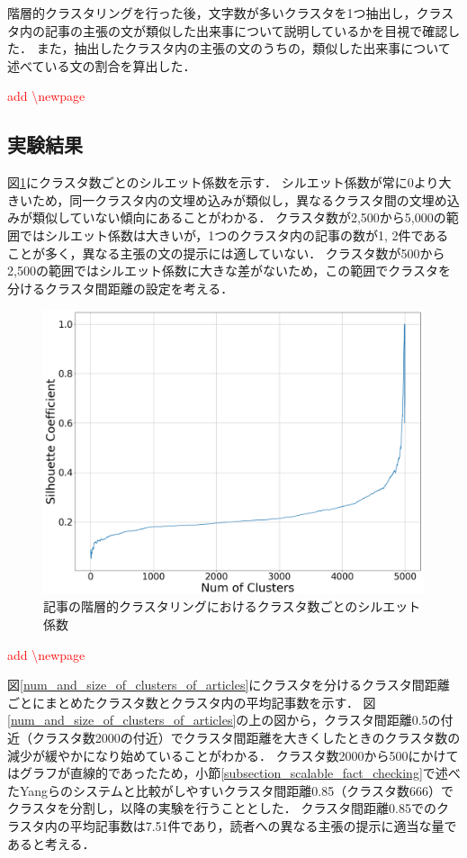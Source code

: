 \documentclass[12pt,a4j]{jreport}
\begin{document}
階層的クラスタリングを行った後，文字数が多いクラスタを1つ抽出し，クラスタ内の記事の主張の文が類似した出来事について説明しているかを目視で確認した．
また，抽出したクラスタ内の主張の文のうちの，類似した出来事について述べている文の割合を算出した．

\textcolor{red}{add \textbackslash newpage}
\newpage

\subsection{実験結果}
図\ref{articles_silhouette}にクラスタ数ごとのシルエット係数を示す．
シルエット係数が常に0より大きいため，同一クラスタ内の文埋め込みが類似し，異なるクラスタ間の文埋め込みが類似していない傾向にあることがわかる．
クラスタ数が2,500から5,000の範囲ではシルエット係数は大きいが，1つのクラスタ内の記事の数が1, 2件であることが多く，異なる主張の文の提示には適していない．
クラスタ数が500から2,500の範囲ではシルエット係数に大きな差がないため，この範囲でクラスタを分けるクラスタ間距離の設定を考える．

\begin{figure}[H]
	\centering
	\includegraphics[keepaspectratio, width=120mm]{img/process-06_articles-cluster_num-of-clusters-dependency-on-silhouette-coefficient_with-maximal-silhoette_reduced-data-to-5000_Trim.png}
	\caption{記事の階層的クラスタリングにおけるクラスタ数ごとのシルエット係数}
	\label{articles_silhouette}
\end{figure}

\textcolor{red}{add \textbackslash newpage}
\newpage

図\ref{num_and_size_of_clusters_of_articles}にクラスタを分けるクラスタ間距離ごとにまとめたクラスタ数とクラスタ内の平均記事数を示す．
図\ref{num_and_size_of_clusters_of_articles}の上の図から，クラスタ間距離0.5の付近（クラスタ数2000の付近）でクラスタ間距離を大きくしたときのクラスタ数の減少が緩やかになり始めていることがわかる．
クラスタ数2000から500にかけてはグラフが直線的であったため，小節\ref{subsection_scalable_fact_checking}で述べたYangらのシステムと比較がしやすいクラスタ間距離0.85（クラスタ数666）でクラスタを分割し，以降の実験を行うこととした\cite{yang_scalable_2021}．
クラスタ間距離0.85でのクラスタ内の平均記事数は7.51件であり，読者への異なる主張の提示に適当な量であると考える．
\end{document}
